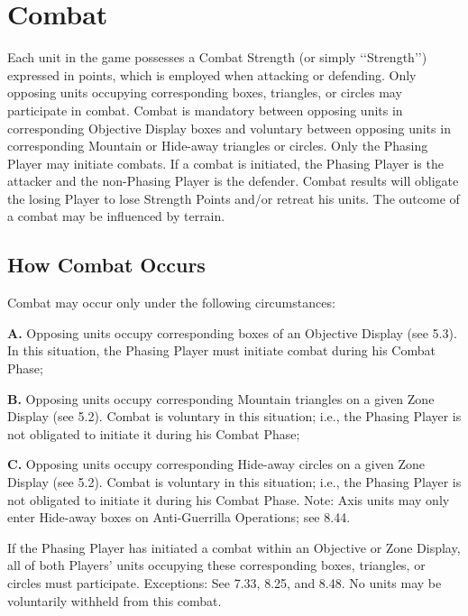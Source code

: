 \section{Combat}\label{sec:8.0}


\begin{generalrule}

Each unit in the game possesses a Combat Strength (or simply ‘‘Strength’’) expressed in points, which is employed when attacking or defending. Only opposing units occupying corresponding boxes, triangles, or circles may participate in combat. Combat is mandatory between opposing units in corresponding Objective Display boxes and voluntary between opposing units in corresponding Mountain or Hide-away triangles or circles. Only the Phasing Player may initiate combats. If a combat is initiated, the Phasing Player is the attacker and the non-Phasing Player is the defender. Combat results will obligate the losing Player to lose Strength Points and/or retreat his units. The outcome of a combat may be influenced by terrain.

\end{generalrule}

\subsection{How Combat Occurs}\label{sec:8.1}

 Combat may occur only under the following circumstances:

\textbf{A.} Opposing units occupy corresponding boxes of an Objective Display (see 5.3). In this situation, the Phasing Player must initiate combat during his Combat Phase;

\textbf{B.} Opposing units occupy corresponding Mountain triangles on a given Zone Display (see 5.2). Combat is voluntary in this situation; i.e., the Phasing Player is not obligated to initiate it during his Combat Phase;

\textbf{C.} Opposing units occupy corresponding Hide-away circles on a given Zone Display (see 5.2). Combat is voluntary in this situation; i.e., the Phasing Player is not obligated to initiate it during his Combat Phase. Note: Axis units may only enter Hide-away boxes on Anti-Guerrilla Operations; see 8.44.

 If the Phasing Player has initiated a combat within an Objective or Zone Display, all of both Players’ units occupying these corresponding boxes, triangles, or circles must participate. Exceptions: See 7.33, 8.25, and 8.48. No units may be voluntarily withheld from this combat.

